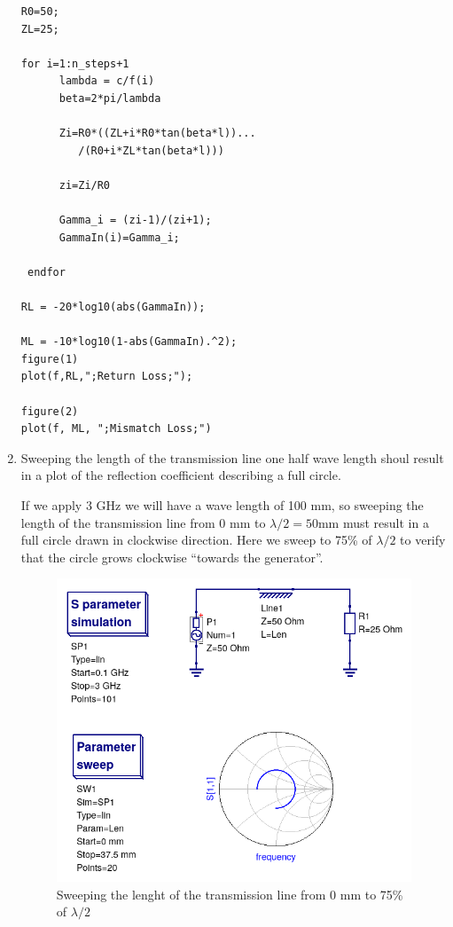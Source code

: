 \documentclass{article}
\begin{document}
\begin{multicols}{2}
\begin{enumerate}[label=(\alph*)]
\begin{verbatim}
R0=50;
ZL=25;

for i=1:n_steps+1
      lambda = c/f(i)
      beta=2*pi/lambda

      Zi=R0*((ZL+i*R0*tan(beta*l))...
         /(R0+i*ZL*tan(beta*l)))

      zi=Zi/R0

      Gamma_i = (zi-1)/(zi+1);
      GammaIn(i)=Gamma_i;

 endfor

RL = -20*log10(abs(GammaIn));

ML = -10*log10(1-abs(GammaIn).^2);
figure(1)
plot(f,RL,";Return Loss;");

figure(2)
plot(f, ML, ";Mismatch Loss;")

\end{verbatim}


\item Sweeping the length of the transmission line one half wave length shoul result in a plot of the reflection coefficient
describing a full circle.

If we apply 3 GHz we will have a wave length of 100 mm, so sweeping the length of the transmission line from 0 mm to
$\lambda/2 = 50$mm must result in a full circle drawn in clockwise direction.
 Here we sweep to 75\% of $\lambda/2$ to verify that the circle grows clockwise ``towards the generator''.
\begin{figure}[H]
  \includegraphics[width=\linewidth]{tline5.png}
  \caption{Sweeping the lenght of the transmission line from 0 mm to 75\% of $\lambda/2$}
  \label{fig4}
\end{figure}


\end{enumerate}
\end{multicols}
\end{document}

